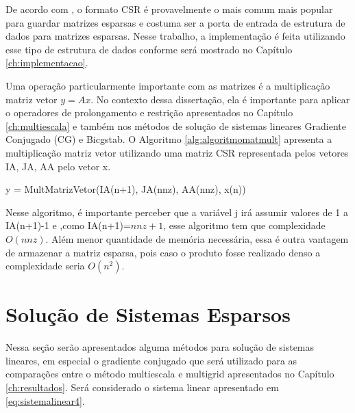 De acordo com \citet{solverlinear}, o formato CSR é provavelmente o mais comum mais popular para guardar matrizes esparsas e costuma ser a porta de entrada de estrutura de dados para matrizes esparsas. Nesse trabalho, a implementação é feita utilizando esse tipo de estrutura de dados conforme será mostrado no Capítulo \ref{ch:implementacao}.

Uma operação particularmente importante com as matrizes é a multiplicação matriz vetor $y = Ax$. No contexto dessa dissertação, ela é importante para aplicar o operadores de prolongamento e restrição apresentados no Capítulo \ref{ch:multiescala} e também nos métodos de solução de sistemas lineares Gradiente Conjugado (CG) e Bicgstab. O Algoritmo \ref{alg:algoritmomatmult} apresenta a multiplicação matriz vetor utilizando uma matriz CSR representada pelos vetores IA, JA, AA pelo vetor x.


\vspace{1cm}
\begin{algorithm}[H]
\caption{y = MultMatrizVetor(IA(n+1), JA(nnz), AA(nnz), x(n))}
\label{alg:algoritmomatmult}

\end{algorithm}
\vspace{1cm}


Nesse algoritmo, é importante perceber que a variável j irá assumir valores de 1 a IA(n+1)-1 e ,como IA(n+1)=$nnz + 1$, esse algoritmo tem que complexidade $O(nnz)$. 
Além menor quantidade de memória necessária, essa é outra vantagem de armazenar  a matriz esparsa, pois caso o produto fosse realizado denso a complexidade seria $O(n^2)$.


\section{Solução de Sistemas Esparsos} \label{sec:cg}

Nessa seção serão apresentados alguma métodos para solução de sistemas lineares, em especial o gradiente conjugado que será utilizado para as comparações entre o método multiescala e multigrid apresentados no Capítulo \ref{ch:resultados}. Será considerado o sistema linear apresentado em \eqref{eq:sistemalinear4}.

